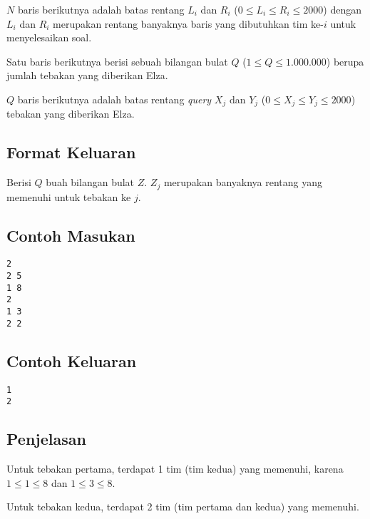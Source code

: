 \documentclass{article}
\begin{document}
$N$ baris berikutnya adalah batas rentang $L_i$ dan $R_i$ ($0 \leq L_i \leq R_i \leq 2000$) dengan $L_i$ dan $R_i$ merupakan rentang banyaknya baris yang dibutuhkan tim ke-$i$ untuk menyelesaikan soal.

Satu baris berikutnya berisi sebuah bilangan bulat $Q$ ($1 \leq Q \leq 1.000.000$) berupa jumlah tebakan yang diberikan Elza.

$Q$ baris berikutnya adalah batas rentang \textit{query} $X_j$ dan $Y_j$ ($0 \leq X_j \leq Y_j \leq 2000$) tebakan yang diberikan Elza. 

\subsection*{Format Keluaran}
Berisi $Q$ buah bilangan bulat $Z$. $Z_j$ merupakan banyaknya rentang yang memenuhi untuk tebakan ke $j$.
\\

\begin{multicols}{2}
\subsection*{Contoh Masukan}
\begin{lstlisting}
2
2 5
1 8
2
1 3
2 2
\end{lstlisting}
\columnbreak
\subsection*{Contoh Keluaran}
\begin{lstlisting}
1
2
\end{lstlisting}
\vfill
\null
\end{multicols}

\subsection*{Penjelasan}
Untuk tebakan pertama, terdapat 1 tim (tim kedua) yang memenuhi, karena $1 \leq 1 \leq 8$ dan $1 \leq 3 \leq 8$.

Untuk tebakan kedua, terdapat 2 tim (tim pertama dan kedua) yang memenuhi.

\pagebreak
\end{document}
